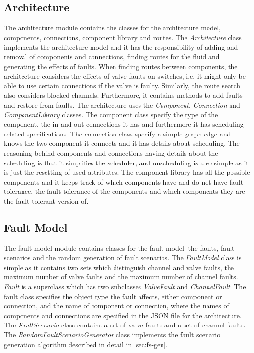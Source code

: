 \subsection{Architecture}
The architecture module contains the classes for the architecture model, components, connections, component library and routes. The \emph{Architecture} class implements the architecture model and it has the responsibility of adding and removal of components and connections, finding routes for the fluid and generating the effects of faults. When finding routes between components, the architecture considers the effects of valve faults on switches, i.e. it might only be able to use certain connections if the valve is faulty. Similarly, the route search also considers blocked channels. Furthermore, it contains methods to add faults and restore from faults. The architecture uses the \emph{Component}, \emph{Connection} and \emph{ComponentLibrary} classes. The component class specify the type of the component, the in and out connections it has and furthermore it has scheduling related specifications. The connection class specify a simple graph edge and knows the two component it connects and it has details about scheduling. The reasoning behind components and connections having details about the scheduling is that it simplifies the scheduler, and unscheduling is also simple as it is just the resetting of used attributes. The component library has all the possible components and it keeps track of which components have and do not have fault-tolerance, the fault-tolerance of the components and which components they are the fault-tolerant version of.

\subsection{Fault Model}
The fault model module contains classes for the fault model, the faults, fault scenarios and the random generation of fault scenarios. The \emph{FaultModel} class is simple as it contains two sets which distinguish channel and valve faults, the maximum number of valve faults and the maximum number of channel faults. \emph{Fault} is a superclass which has two subclasses \emph{ValveFault} and \emph{ChannelFault}. The fault class specifies the object type the fault affects, either component or connection, and the name of component or connection, where the names of components and connections are specified in the JSON file for the architecture. The \emph{FaultScenario} class contains a set of valve faults and a set of channel faults. The \emph{RandomFaultScenarioGenerator} class implements the fault scenario generation algorithm described in detail in \autoref{sec:fs-gen}.

